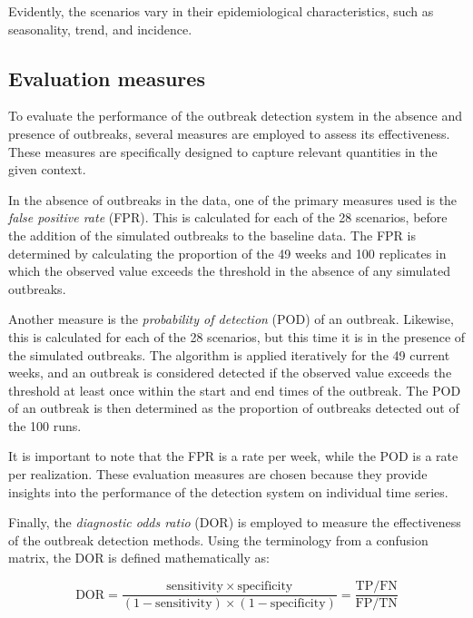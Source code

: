 \documentclass[preprint, 3p, authoryear]{elsarticle} %
\begin{document}
Evidently, the scenarios vary in their epidemiological characteristics, such as seasonality, trend, and incidence.

\hypertarget{evaluation-measures}{%
\subsection{Evaluation measures}\label{evaluation-measures}}

To evaluate the performance of the outbreak detection system in the absence and presence of outbreaks, several measures are employed to assess its effectiveness. These measures are specifically designed to capture relevant quantities in the given context.

In the absence of outbreaks in the data, one of the primary measures used is the \emph{false positive rate} (FPR). This is calculated for each of the 28 scenarios, before the addition of the simulated outbreaks to the baseline data. The FPR is determined by calculating the proportion of the 49 weeks and 100 replicates in which the observed value exceeds the threshold in the absence of any simulated outbreaks.

Another measure is the \emph{probability of detection} (POD) of an outbreak. Likewise, this is calculated for each of the 28 scenarios, but this time it is in the presence of the simulated outbreaks. The algorithm is applied iteratively for the 49 current weeks, and an outbreak is considered detected if the observed value exceeds the threshold at least once within the start and end times of the outbreak. The POD of an outbreak is then determined as the proportion of outbreaks detected out of the 100 runs.

It is important to note that the FPR is a rate per week, while the POD is a rate per realization. These evaluation measures are chosen because they provide insights into the performance of the detection system on individual time series.

Finally, the \emph{diagnostic odds ratio} (DOR) is employed to measure the effectiveness of the outbreak detection methods. Using the terminology from a confusion matrix, the DOR is defined mathematically as:

\begin{equation}
\mathrm{DOR} = \frac{\mathrm{sensitivity} \times \mathrm{specificity}}{(1-\mathrm{sensitivity}) \times (1-\mathrm{specificity})}= \frac{\mathrm{TP}/\mathrm{FN}}{\mathrm{FP}/\mathrm{TN}}
\end{equation}
\end{document}
